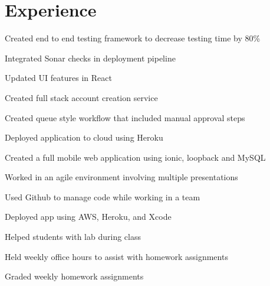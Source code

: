 \documentclass[]{deedy-resume-openfont}
\begin{document}
\begin{minipage}[t]{0.66\textwidth} 


\section{Experience}

\vspace{\topsep} %
\begin{tightemize}
\item Created end to end testing framework to decrease testing time by 80\%
\item Integrated Sonar checks in deployment pipeline
\item Updated UI features in React
\end{tightemize}
\sectionsep



\begin{tightemize}
\item Created full stack account creation service
\item Created queue style workflow that included manual approval steps
\item Deployed application to cloud using Heroku
\end{tightemize}
\sectionsep

\begin{tightemize}
 \item Created a full mobile web application using ionic, loopback and MySQL \item Worked in an agile environment involving multiple presentations \item Used Github to manage code while working in a team \item Deployed app using AWS, Heroku, and Xcode\end{tightemize}
\sectionsep

\begin{tightemize}
\item Helped students with lab during class \item Held weekly office hours to assist with homework assignments \item Graded weekly homework assignments
\end{tightemize}
\sectionsep


\end{minipage}
\end{document}
